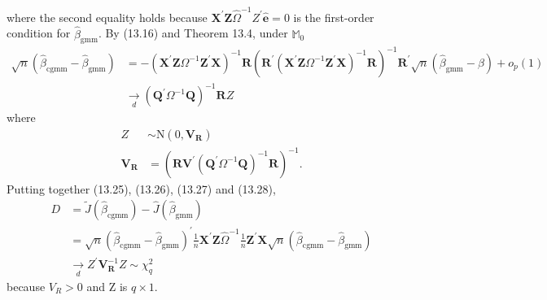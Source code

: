 \documentclass[10pt]{article}
\begin{document}
where the second equality holds because $\boldsymbol{X}^{\prime} \boldsymbol{Z} \widehat{\Omega}^{-1} Z^{\prime} \widehat{\boldsymbol{e}}=0$ is the first-order condition for $\widehat{\beta}_{\mathrm{gmm}}$. By (13.16) and Theorem 13.4, under $\mathbb{M}_{0}$
$$
\begin{aligned}
\sqrt{n}\left(\widehat{\beta}_{\mathrm{cgmm}}-\widehat{\beta}_{\mathrm{gmm}}\right) &=-\left(\boldsymbol{X}^{\prime} \boldsymbol{Z} \Omega^{-1} \boldsymbol{Z}^{\prime} \boldsymbol{X}\right)^{-1} \boldsymbol{R}\left(\boldsymbol{R}^{\prime}\left(\boldsymbol{X}^{\prime} \boldsymbol{Z} \Omega^{-1} \boldsymbol{Z}^{\prime} \boldsymbol{X}\right)^{-1} \boldsymbol{R}\right)^{-1} \boldsymbol{R}^{\prime} \sqrt{n}\left(\widehat{\beta}_{\mathrm{gmm}}-\beta\right)+o_{p}(1) \\
& \underset{d}{\longrightarrow}\left(\boldsymbol{Q}^{\prime} \Omega^{-1} \boldsymbol{Q}\right)^{-1} \boldsymbol{R} Z
\end{aligned}
$$
where
$$
\begin{aligned}
Z & \sim \mathrm{N}\left(0, \boldsymbol{V}_{\boldsymbol{R}}\right) \\
\boldsymbol{V}_{\boldsymbol{R}} &=\left(\boldsymbol{R} \boldsymbol{V}^{\prime}\left(\boldsymbol{Q}^{\prime} \Omega^{-1} \boldsymbol{Q}\right)^{-1} \boldsymbol{R}\right)^{-1} .
\end{aligned}
$$
Putting together (13.25), (13.26), (13.27) and (13.28),
$$
\begin{aligned}
D &=\widetilde{J}\left(\widehat{\beta}_{\mathrm{cgmm}}\right)-\widehat{J}\left(\widehat{\beta}_{\mathrm{gmm}}\right) \\
&=\sqrt{n}\left(\widehat{\beta}_{\mathrm{cgmm}}-\widehat{\beta}_{\mathrm{gmm}}\right)^{\prime} \frac{1}{n} \boldsymbol{X}^{\prime} \boldsymbol{Z} \widehat{\Omega}^{-1} \frac{1}{n} \boldsymbol{Z}^{\prime} \boldsymbol{X} \sqrt{n}\left(\widehat{\beta}_{\mathrm{cgmm}}-\widehat{\beta}_{\mathrm{gmm}}\right) \\
& \underset{d}{\longrightarrow} Z^{\prime} \boldsymbol{V}_{\boldsymbol{R}}^{-1} Z \sim \chi_{q}^{2}
\end{aligned}
$$
because $V_{R}>0$ and $\mathrm{Z}$ is $q \times 1$.
\end{document}
